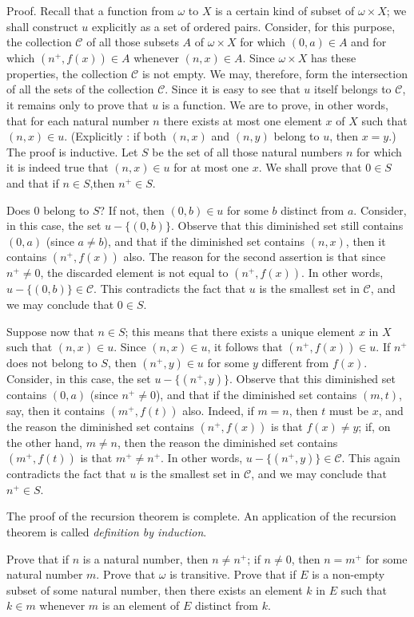 Proof. Recall that a function from $\omega$ to $X$ is a certain kind of subset of $ \omega \times X$; we shall construct $u$ explicitly as a set of ordered  pairs. Consider, for this purpose, the collection $\mathcal{C}$ of all those subsets $A$ of $\omega \times X$ for which $(0, a) \in A$ and for which $(n^{+}, f(x)) \in A$ whenever $(n, x) \in A$. Since $ \omega \times X$ has these properties, the collection $\mathcal{C}$ is not empty. We may, therefore, form the intersection of all the sets of the collection $\mathcal{C}$. Since it is easy to see that $u$ itself belongs to $\mathcal{C}$, it remains only to prove that $u$ is a function. We are to prove, in other words, that for each natural number $n$ there exists at most one element $x$ of $X$ such that $(n, x) \in u$. (Explicitly : if both $(n, x)$ and $(n, y)$ belong to $u$, then $x = y$.) The proof is inductive. Let $S$ be the set of all those natural numbers $n$ for which it is indeed true that $(n, x) \in u$ for at most one $x$. We shall prove that $0 \in S$ and that if $n \in S$,then $n^{+} \in S$.

Does $0$ belong to $S$? If not, then $(0,b) \in u$ for some $b$ distinct from $a$. Consider, in this case, the set $u - \{ (0, b) \}$. Observe that this diminished set still contains $(0, a)$ (since $a \neq b$), and that if the diminished set contains $(n, x)$, then it contains $(n^{+}, f(x))$ also. The reason for the second assertion is that since $n^{+} \neq 0$, the discarded element is not equal to $(n^{+}, f(x))$. In other words, $u - \{ (0, b) \} \in \mathcal{C}$. This contradicts the fact that $u$ is the smallest set in $\mathcal{C}$, and we may conclude that $0 \in S$. 

Suppose now that $n \in S$; this means that there exists a unique element $x$ in $X$ such that $(n, x) \in u$. Since $(n, x) \in u$, it follows that $(n^{+}, f(x)) \in u$. If $n^{+}$ does not belong to $S$, then $(n^{+}, y) \in u$ for some $y$ different from $f(x)$. Consider, in this case, the set $u - \{ (n^{+}, y) \}$. Observe that this diminished set contains $(0, a)$ (since $n^{+} \neq 0$), and that if the diminished set contains $(m, t)$, say, then it contains $(m^{+}, f(t))$ also. Indeed, if $m = n$, then $t$ must be $x$, and the reason the diminished set contains $(n^{+}, f(x))$ is that $f(x) \neq y$; if, on the other hand, $m \neq n$, then the reason the diminished set contains $(m^{+}, f(t))$ is that $m^{+} \neq n^{+}$. In other words, $u - \{ ( n^{+}, y) \} \in \mathcal{C}$. This again contradicts the fact that $u$ is the smallest set in $\mathcal{C}$, and we may conclude that $n^{+} \in S$. 

The proof of the recursion theorem is complete. An application of the recursion theorem is called \textit{definition by induction}. 

\begin{exercise} Prove that if $n$ is a natural number, then $n \neq n^{+}$; if $n \neq 0$, then $n = m^{+}$ for some natural number $m$. Prove that $ \omega $ is transitive. Prove that if $E$ is a non-empty subset of some natural number, then there exists an element $k$ in $E$ such that $k \in m$ whenever $m$ is an element of $E$ distinct from $k$.
\end{exercise}
